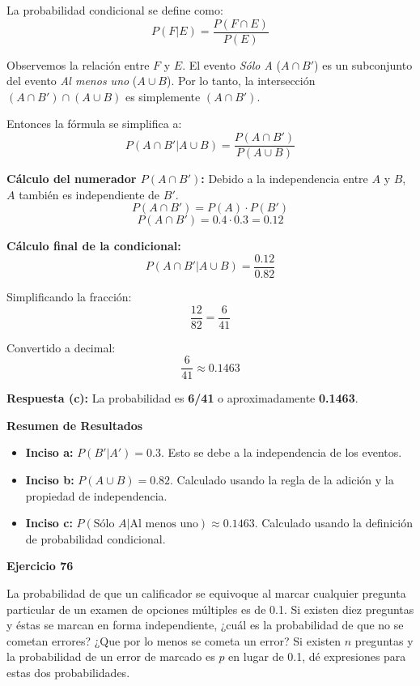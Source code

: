 \documentclass[a4paper]{article}
\begin{document}
La probabilidad condicional se define como:
$$ P(F | E) = \frac{P(F \cap E)}{P(E)} $$

Observemos la relación entre $F$ y $E$. El evento \textit{Sólo A} ($A \cap B'$) es un subconjunto del evento \textit{Al menos uno} ($A \cup B$). Por lo tanto, la intersección $(A \cap B') \cap (A \cup B)$ es simplemente $(A \cap B')$.

Entonces la fórmula se simplifica a:
$$ P(A \cap B' | A \cup B) = \frac{P(A \cap B')}{P(A \cup B)} $$

\textbf{Cálculo del numerador $P(A \cap B')$:}
Debido a la independencia entre $A$ y $B$, $A$ también es independiente de $B'$.
$$ P(A \cap B') = P(A) \cdot P(B') $$
$$ P(A \cap B') = 0.4 \cdot 0.3 = 0.12 $$

\textbf{Cálculo final de la condicional:}
$$ P(A \cap B' | A \cup B) = \frac{0.12}{0.82} $$

Simplificando la fracción:
$$ \frac{12}{82} = \frac{6}{41} $$

Convertido a decimal:
$$ \frac{6}{41} \approx 0.1463 $$

\textbf{Respuesta (c):} La probabilidad es \textbf{6/41} o aproximadamente \textbf{0.1463}.

\vspace{0.5cm}

\textbf{Resumen de Resultados}

\begin{itemize}
    \item \textbf{Inciso a:} $P(B' | A') = 0.3$. Esto se debe a la independencia de los eventos.
    \item \textbf{Inciso b:} $P(A \cup B) = 0.82$. Calculado usando la regla de la adición y la propiedad de independencia.
    \item \textbf{Inciso c:} $P(\text{Sólo } A | \text{Al menos uno}) \approx 0.1463$. Calculado usando la definición de probabilidad condicional.
\end{itemize}


\textbf{Ejercicio 76}

La probabilidad de que un calificador se equivoque al marcar cualquier pregunta particular de un examen de opciones múltiples es de 0.1. Si existen diez preguntas y éstas se marcan en forma independiente, ¿cuál es la probabilidad de que no se cometan errores? ¿Que por lo menos se cometa un error? Si existen $n$ preguntas y la probabilidad de un error de marcado es $p$ en lugar de 0.1, dé expresiones para estas dos probabilidades.
\end{document}
